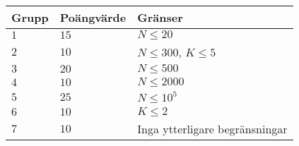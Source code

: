 \noindent
\begin{tabular}{| l | l | p{12cm} |}
  \hline
  Grupp & Poängvärde & Gränser \\ \hline
 
  $1$   & $15$       & $N \leq 20$\\ \hline
  $2$   & $10$       & $N \leq 300$, $K \leq 5$  \\ \hline
  $3$   & $20$       & $N \leq 500$ \\ \hline
  $4$   & $10$       & $N \leq 2000$ \\ \hline
  $5$   & $25$       & $N \leq 10^5$ \\ \hline
  $6$   & $10$       & $K \leq 2$ \\ \hline
  $7$   & $10$       & Inga ytterligare begränsningar \\ \hline
\end{tabular}
